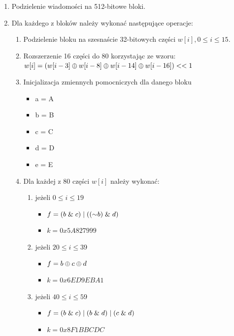 \begin{enumerate}
\begin{enumerate}
{					00000000 00000000 00000000 00000000 \\ 
					00000000 00000000 00000000 00000000 \\ 
					00000000 00000000 00000000 00000031 }
		\end{enumerate}
	\item Podzielenie wiadomości na 512-bitowe bloki.
	\item Dla każdego z bloków należy wykonać następujące operacje:
		\begin{enumerate}
			\item Podzielenie bloku na szesnaście 32-bitowych części $w[i], 0 \leq i \leq 15$.
			\item Rozszerzenie 16 części do 80 korzystając ze wzoru: \\
				$w[i] = (w[i-3] \mathbin{\oplus} w[i-8] \mathbin{\oplus} w[i-14] \mathbin{\oplus} w[i-16]) << 1$
			\item Inicjalizacja zmiennych pomocniczych dla danego bloku
				\begin{itemize}
					\item a = A
					\item b = B
					\item c = C
					\item d = D
					\item e = E
				\end{itemize}
			\item Dla każdej z 80 części $w[i]$ należy wykonać:
				\begin{enumerate}
					\item jeżeli $0 \leq i \leq 19$ 
				        \begin{itemize} 
				        	\item $f = (b \mathrel{\&} c) \mathrel{|} ((\mathord{\sim} b) \mathrel{\&} d)$
				            \item $k = 0x5A827999$
				        \end{itemize}
					\item jeżeli $20 \leq i \leq 39$
						\begin{itemize} 
            				\item $f = b \mathbin{\oplus} c \mathbin{\oplus} d$
            				\item $k = 0x6ED9EBA1$
            			\end{itemize}
				    \item jeżeli $40 \leq i \leq 59$
				        \begin{itemize} 
				        	\item $f = (b \mathrel{\&} c) \mathrel{|} (b \mathrel{\&} d) \mathrel{|} (c \mathrel{\&} d)$ 
            				\item $k = 0x8F1BBCDC$

\end{itemize}
\end{enumerate}
\end{enumerate}
\end{enumerate}

